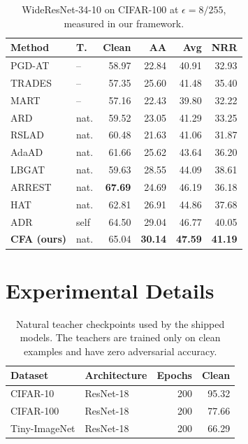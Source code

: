 \documentclass{article} %
\theoremstyle{plain}
\begin{document}
\begin{table}[!htbp]
  \centering \small \setlength{\tabcolsep}{5pt}
  \caption{WideResNet-34-10 on CIFAR-100 at $\epsilon=8/255$, measured in our framework.}
  \label{tab:wrn100}
  \begin{tabular}{llrrrr}
    \toprule
    Method & T. & Clean & AA & Avg & NRR \\
    \midrule
    PGD-AT & -- & 58.97 & 22.84 & 40.91 & 32.93 \\
    TRADES & -- & 57.35 & 25.60 & 41.48 & 35.40 \\
    MART & -- & 57.16 & 22.43 & 39.80 & 32.22 \\
    \midrule
    ARD & nat. & 59.52 & 23.05 & 41.29 & 33.25 \\
    RSLAD & nat. & 60.48 & 21.63 & 41.06 & 31.87 \\
    AdaAD & nat. & 61.66 & 25.62 & 43.64 & 36.20 \\
    LBGAT & nat. & 59.63 & 28.55 & 44.09 & 38.61 \\
    ARREST & nat. & \textbf{67.69} & 24.69 & 46.19 & 36.18 \\
    HAT & nat. & 62.81 & 26.91 & 44.86 & 37.68 \\
    ADR & self & 64.50 & 29.04 & 46.77 & 40.05 \\
    \midrule
    \textbf{CFA (ours)} & nat. & 65.04 & \textbf{30.14} & \textbf{47.59} & \textbf{41.19} \\
    \bottomrule
  \end{tabular}
\end{table}

\section{Experimental Details}
\label{app:repro}

\begin{table}[!htbp]
  \centering \small \setlength{\tabcolsep}{5pt}
  \caption{Natural teacher checkpoints used by the shipped models. The teachers are trained only on
  clean examples and have zero adversarial accuracy.}
  \label{tab:teachers}
  \begin{tabular}{llrr}
    \toprule
    Dataset & Architecture & Epochs & Clean \\
    \midrule
    CIFAR-10      & ResNet-18 & 200 & 95.32 \\
    CIFAR-100     & ResNet-18 & 200 & 77.66 \\
    Tiny-ImageNet & ResNet-18 & 200 & 66.29 \\
    \bottomrule
  \end{tabular}
\end{table}
\end{document}

